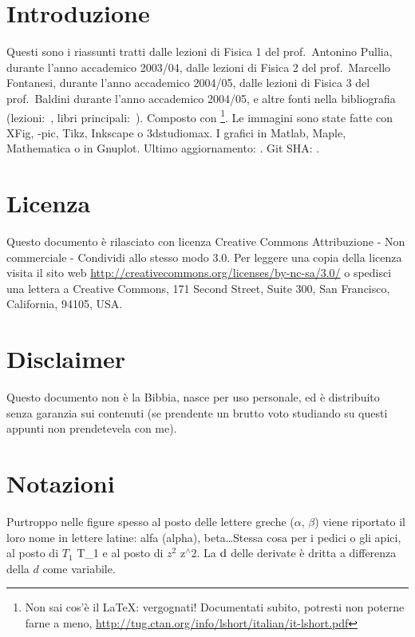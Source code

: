 \sffamily\itshape
\section*{\centering Introduzione}

Questi sono i riassunti tratti dalle lezioni di Fisica 1 del %
prof.~Antonino Pullia, durante l'anno accademico 2003/04, dalle lezioni di Fisica 2 del prof.~Marcello Fontanesi, durante l'anno accademico 2004/05, dalle lezioni di Fisica 3 del prof.~Baldini durante l'anno accademico 2004/05, e altre fonti nella bibliografia (lezioni:~\cite{Pullia, Fontanesi, Baldini, Paganoni, Lucchini, Franzoni, Monica, Barney, Maddalena}, libri principali:~\cite{Fisica1, Feynm, modern, elettro, ottica, enge, alonso, jackson, mazzoldi}). Composto con \LaTeXe\footnote{Non sai cos'è il \LaTeX: vergognati! Documentati subito, potresti non poterne farne a meno, \href{http://tug.ctan.org/info/lshort/italian/it-lshort.pdf}{http://tug.ctan.org/info/lshort/italian/it-lshort.pdf}}. Le immagini sono state fatte con XFig, \Xy-pic, Tikz, Inkscape o 3dstudiomax. I grafici in Matlab, Maple, Mathematica o in Gnuplot.
\newline\newline
Ultimo aggiornamento: \gitAuthorDate. Git SHA: \texttt{\gitAbbrevHash}.

\section*{\centering Licenza}
Questo documento è rilasciato con licenza Creative Commons Attribuzione - Non commerciale - Condividi allo stesso modo 3.0. Per leggere una copia della licenza visita il sito web \url{http://creativecommons.org/licenses/by-nc-sa/3.0/} o spedisci una lettera a Creative Commons, 171 Second Street, Suite 300, San Francisco, California, 94105, USA. \ccbyncsaeu

\section*{\centering Disclaimer}
Questo documento non è la Bibbia, nasce per uso personale, ed è distribuito senza garanzia sui contenuti (se prendente un brutto voto studiando su questi appunti non prendetevela con me).
\section*{\centering Notazioni}
Purtroppo nelle figure spesso al posto delle lettere greche (\(\alpha\), \(\beta\)) viene riportato il loro nome in lettere latine: alfa (alpha), beta\ldots Stessa cosa per i pedici o gli apici, al posto di \(T_1\) T\_1 e al posto di \(z^2\) z\(^\wedge\)2. La \(\mathrm{d}\) delle derivate è dritta a differenza della \(d\) come variabile.
\newpage
